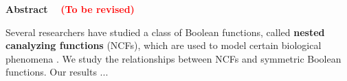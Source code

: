 \vspace*{-0.05in}
\begin{center}
\textbf{Abstract}~~ \textcolor{red}{\textbf{(To be revised)}}
\end{center}

\smallskip

Several researchers have studied 
a class of Boolean functions, 
called \textbf{nested canalyzing functions} (NCFs),
which are used to model certain biological 
phenomena \cite{Kauffman-1969,Kauffman-etal-2003,Kauffman-etal-2004}.
We study the relationships between NCFs and symmetric 
Boolean functions. Our results ...

